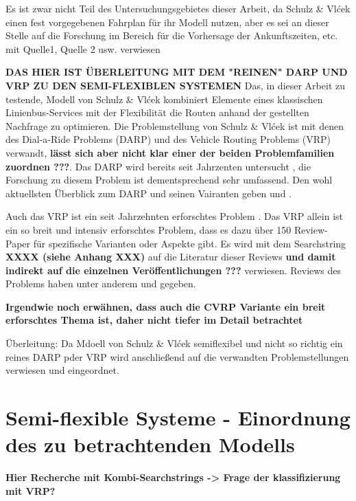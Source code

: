 Es ist zwar nicht Teil des Untersuchungsgebietes dieser Arbeit, da Schulz \& Vlćek einen fest vorgegebenen Fahrplan für ihr Modell nutzen, aber es sei an dieser Stelle auf die Forschung im Bereich für die Vorhersage der Ankunftszeiten, etc. mit Quelle1, Quelle 2 usw. verwiesen

\textbf{DAS HIER IST ÜBERLEITUNG MIT DEM "REINEN" DARP UND VRP ZU DEN SEMI-FLEXIBLEN SYSTEMEN}
Das, in dieser Arbeit zu testende, Modell von Schulz \& Vlćek kombiniert Elemente eines klassischen Linienbus-Services mit der Flexibilität die Routen anhand der gestellten Nachfrage zu optimieren. Die Problemstellung von Schulz \& Vlćek ist mit denen des Dial-a-Ride Problems (DARP) und des Vehicle Routing Problems (VRP) verwandt, \textbf{lässt sich aber nicht klar einer der beiden Problemfamilien zuordnen ???}. Das DARP wird bereits seit Jahrzenten untersucht \parencite{psaraftis_dynamic_1980}, die Forschung zu diesem Problem ist dementsprechend sehr umfassend. Den wohl aktuellsten Überblick zum DARP und seinen Vairanten geben \textcite{molenbruch_typology_2017} und \textcite{ho_survey_2018}. 

Auch das VRP ist ein seit Jahrzehnten erforschtes Problem \parencite{orloff_fundamental_1974}. Das VRP allein ist ein so breit und intensiv erforschtes Problem, dass es dazu über 150 Review-Paper für spezifische Varianten oder Aspekte gibt. Es wird mit dem Searchstring \textbf{XXXX (siehe Anhang XXX)} auf die Literatur dieser Reviews \textbf{und damit indirekt auf die einzelnen Veröffentlichungen ???} verwiesen. Reviews des Problems haben unter anderem \textcite{braekers_vehicle_2016} und \textcite{vidal_concise_2020} gegeben. 

\textbf{Irgendwie noch erwähnen, dass auch die CVRP Variante ein breit erforschtes Thema ist, daher nicht tiefer im Detail betrachtet}

Überleitung: Da Mdoell von Schulz \& Vlćek semiflexibel und nicht so richtig ein reines DARP pder VRP wird anschließend auf die verwandten Problemstellungen verwiesen und eingeordnet.


\section{Semi-flexible Systeme - Einordnung des zu betrachtenden Modells}
\label{sec:Einordnung}
\label{sec:2.2}


\textbf{Hier Recherche mit Kombi-Searchstrings -> Frage der klassifizierung mit VRP?}

